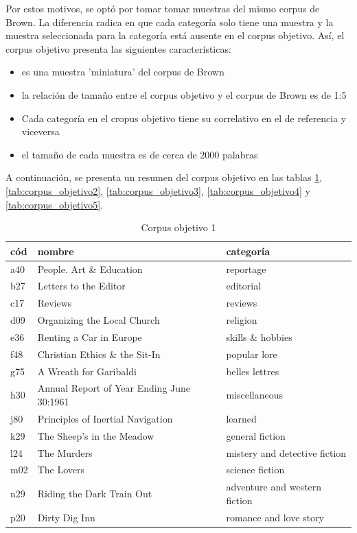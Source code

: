 \documentclass[twoside]{article}
\begin{document}
Por estos motivos, se optó por tomar tomar muestras del mismo corpus de Brown.
La diferencia radica en que cada categoría solo tiene una muestra y la muestra
seleccionada para la categoría está ausente en el corpus objetivo. Así,
el corpus objetivo presenta las siguientes características:

\begin{itemize}
\item es una muestra 'miniatura' del corpus de Brown
\item la relación de tamaño entre el corpus objetivo y el corpus de Brown es de 1:5
\item Cada categoría en el cropus objetivo tiene su correlativo en el de referencia y viceversa
\item el tamaño de cada muestra es de cerca de 2000 palabras
\end{itemize}

A continuación, se presenta un resumen del corpus objetivo en las
tablas \ref{tab:corpus_objetivo1},
\ref{tab:corpus_objetivo2}, \ref{tab:corpus_objetivo3},
\ref{tab:corpus_objetivo4} y \ref{tab:corpus_objetivo5}.



   \begin{table}[!ht]
    \centering

    \begin{tabular}{|l|l|l|}
    \hline
	cód & nombre & categoría \\ \hline
      a40 & People. Art \& Education & reportage \\ \hline
      b27 & Letters to the Editor & editorial \\ \hline
      c17 & Reviews & reviews \\ \hline
      d09 & Organizing the Local Church & religion \\ \hline
      e36 & Renting a Car in Europe & skills \& hobbies \\ \hline
      f48 & Christian Ethics \& the Sit-In & popular lore \\ \hline
      g75 & A Wreath for Garibaldi & belles lettres \\ \hline
      h30 & Annual Report of Year Ending June 30:1961 & miscellaneous \\ \hline
      j80 & Principles of Inertial Navigation & learned \\ \hline
      k29 & The Sheep's in the Meadow & general fiction \\ \hline
      l24 & The Murders & mistery and detective fiction \\ \hline
      m02 & The Lovers & science fiction \\ \hline
      n29 & Riding the Dark Train Out & adventure and western fiction \\ \hline
      p20 & Dirty Dig Inn & romance and love story \\ \hline
    \end{tabular}
\caption{Corpus objetivo 1}
\label{tab:corpus_objetivo1}
\end{table}
\end{document}
